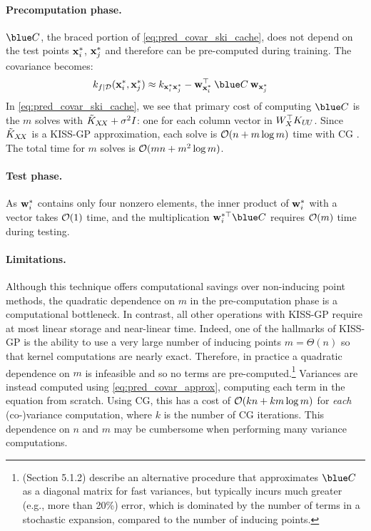 \paragraph{Precomputation phase.}
$\blue C$, the braced portion of \eqref{eq:pred_covar_ski_cache}, does not depend on the test points $\mathbf{x}^{*}_{i}$, $\mathbf{x}^{*}_{j}$ and therefore can be pre-computed during training.
The covariance becomes:
%
\begin{align}
  k_{f\mid\dset}(\bx^*_i, \bx^*_j) &\approx k_{\bx^{*}_i \bx^{*}_j} - \bw_{\bx^{*}_i}^\top \: \blue C \: \bw_{\bx^{*}_j}
    \label{eq:pred_covar_ski_naive}
\end{align}
%
In \eqref{eq:pred_covar_ski_cache}, we see that primary cost of computing $\blue C$ is the $m$ solves with $\tilde{K}_{X\!X} + \sigma^2 I$: one for each column vector in $W^{\top}_{X} K_{U \! U}$.
Since $\tilde {K}_{X\!X}$ is a KISS-GP approximation, each solve is $\bigo{n + m\log m}$ time with CG \cite{wilson2015kernel}.
The total time for $m$ solves is $\bigo{mn + m^2 \log m}$.

\paragraph{Test phase.}
As $\mathbf{w}^{*}_{i}$ contains only four nonzero elements,
the inner product of $\mathbf{w}^{*}_{i}$ with a vector takes $\bigo{1}$ time,
and the multiplication $\bw^{*\top}_{i}\blue C$ requires $\bigo{m}$ time during testing.

\paragraph{Limitations.}
Although this technique offers computational savings over non-inducing point methods, the quadratic dependence on $m$ in the pre-computation phase is a computational bottleneck.
In contrast, all other operations with KISS-GP require at most linear storage and near-linear time.
Indeed, one of the hallmarks of KISS-GP is the ability to use a very large number of inducing points $m = \Theta(n)$ so that kernel computations are nearly exact.
Therefore, in practice a quadratic dependence on $m$ is infeasible and so no terms are pre-computed.\footnote{
  \citet{wilson2015thoughts} (Section 5.1.2) describe an alternative procedure that approximates $\blue C$ as a diagonal matrix
  for fast variances, but typically incurs much greater (e.g., more than 20\%) error, which is dominated by the number of terms in
  a stochastic expansion, compared to the number of inducing points.}
Variances are instead computed using \eqref{eq:pred_covar_approx}, computing each term in the equation from scratch.
Using CG, this has a cost of $\bigo{k n + k m \log m}$ for \emph{each} (co-)variance computation, where $k$ is the number of CG iterations.
This dependence on $n$ and $m$ may be cumbersome when performing many variance computations.

